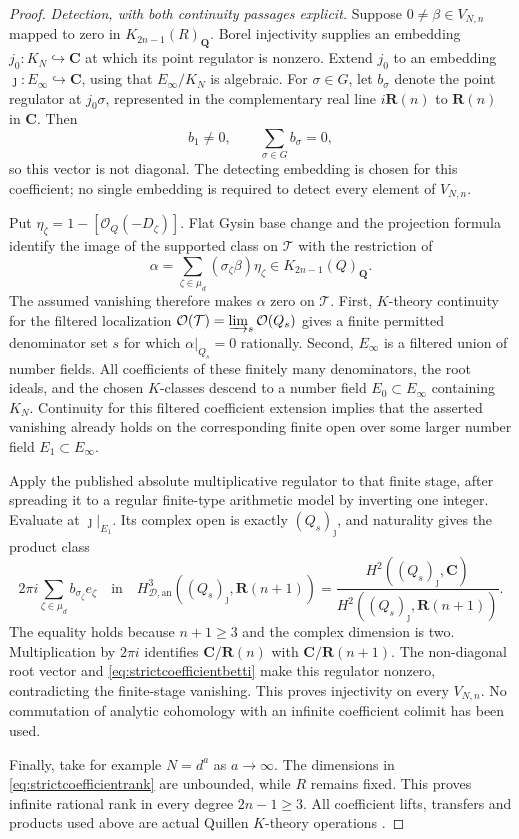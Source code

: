 \documentclass[11pt,a4paper]{article}
\theoremstyle{remark}
\newcommand{\Q}{\mathbf Q}
\newcommand{\R}{\mathbf R}
\newcommand{\C}{\mathbf C}
\begin{document}
\begin{proof}
\emph{Detection, with both continuity passages explicit.}
Suppose $0\ne\beta\in V_{N,n}$ mapped to zero in
$K_{2n-1}(R)_{\Q}$. Borel injectivity supplies an embedding
$j_0:K_N\hookrightarrow\C$ at which its point regulator
is nonzero. Extend $j_0$ to an embedding
$\jmath:E_\infty\hookrightarrow\C$, using that
$E_\infty/K_N$ is algebraic.
For $\sigma\in G$, let $b_\sigma$ denote the point regulator
at $j_0\sigma$, represented in the complementary real line
$i\R(n)$ to $\R(n)$ in $\C$. Then
\[
 b_1\ne0,\qquad \sum_{\sigma\in G}b_\sigma=0,
\]
so this vector is not diagonal. The detecting embedding is
chosen for this coefficient; no single embedding is required
to detect every element of $V_{N,n}$.

Put $\eta_\zeta=1-[\mathcal O_Q(-D_\zeta)]$. Flat Gysin
base change and the projection formula identify the image of
the supported class on $\mathcal T$ with the restriction of
\[
 \alpha=\sum_{\zeta\in\mu_d}(\sigma_\zeta\beta)\eta_\zeta
       \in K_{2n-1}(Q)_{\Q}.
\]
The assumed vanishing therefore makes $\alpha$ zero on
$\mathcal T$. First, $K$-theory continuity for the filtered
localization
$\mathcal O(\mathcal T)=\varinjlim_s\mathcal O(Q_s)$
gives a finite permitted denominator set $s$ for which
$\alpha|_{Q_s}=0$ rationally.
Second, $E_\infty$ is a filtered union of number fields.
All coefficients of these finitely many denominators, the
root ideals, and the chosen $K$-classes descend to a number
field $E_0\subset E_\infty$ containing $K_N$.
Continuity for this filtered coefficient extension implies
that the asserted vanishing already holds on the corresponding
finite open over some larger number field
$E_1\subset E_\infty$.

Apply the published absolute multiplicative regulator to that
finite stage, after spreading it to a regular finite-type
arithmetic model by inverting one integer. Evaluate at
$\jmath|_{E_1}$. Its complex open is exactly
$(Q_s)_\jmath$, and naturality gives the product class
\[
 2\pi i\sum_{\zeta\in\mu_d}b_{\sigma_\zeta}e_\zeta
 \quad\text{in}\quad
 H^3_{\mathcal D,\mathrm{an}}((Q_s)_\jmath,\R(n+1))
 =\frac{H^2((Q_s)_\jmath,\C)}
        {H^2((Q_s)_\jmath,\R(n+1))}.
\]
The equality holds because $n+1\ge3$ and the complex
dimension is two. Multiplication by $2\pi i$ identifies
$\C/\R(n)$ with $\C/\R(n+1)$. The non-diagonal root
vector and \eqref{eq:strictcoefficientbetti} make this
regulator nonzero, contradicting the finite-stage vanishing.
This proves injectivity on every $V_{N,n}$.
No commutation of analytic cohomology with an infinite
coefficient colimit has been used.

Finally, take for example $N=d^a$ as $a\to\infty$.
The dimensions in \eqref{eq:strictcoefficientrank} are
unbounded, while $R$ remains fixed. This proves infinite
rational rank in every degree $2n-1\ge3$.
All coefficient lifts, transfers and products used above are
actual Quillen $K$-theory operations
\cite{Quillen,QuillenFinite,Weibel,Borel,BunkeTamme}.
\end{proof}
\end{document}
